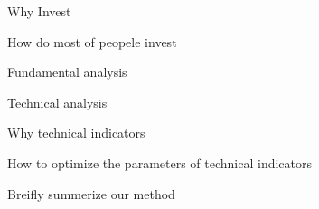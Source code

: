 \documentclass[../main.tex]{subfiles}
\begin{document}

Why Invest

How do most of peopele invest

Fundamental analysis

Technical analysis

Why technical indicators

How to optimize the parameters of technical indicators

Breifly summerize our method
\end{document}

